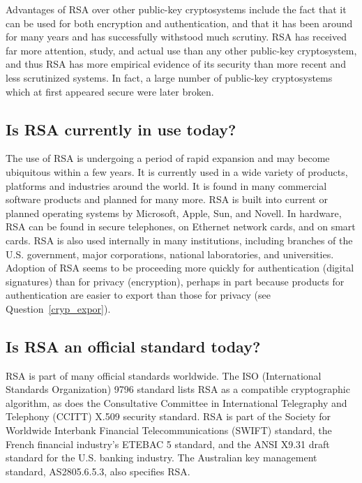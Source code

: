 Advantages of RSA over other public-key cryptosystems include the fact
that it can be used for both encryption and authentication, and that it
has been around for many years and has successfully withstood much
scrutiny. RSA has received far more attention, study, and actual use
than any other public-key cryptosystem, and thus RSA has more empirical
evidence of its security than more recent and less scrutinized systems.
In fact, a large number of public-key cryptosystems which at first
appeared secure were later broken.

\subsection{Is RSA currently in use today?}

The use of RSA is undergoing a period of rapid expansion and may become
ubiquitous within a few years. It is currently used in a wide variety
of products, platforms and industries around the world. It is found in
many commercial software products and planned for many more. RSA is
built into current or planned operating systems by Microsoft, Apple,
Sun, and Novell. In hardware, RSA can be found in secure telephones, on
Ethernet network cards, and on smart cards. RSA is also used internally
in many institutions, including branches of the U.S. government, major
corporations, national laboratories, and universities.\\

Adoption of RSA seems to be proceeding more quickly for authentication
(digital signatures) than for privacy (encryption), perhaps in part
because products for authentication are easier to export than those for
privacy (see Question~\ref{cryp_expor}).

\subsection{Is RSA an official standard today?}

RSA is part of many official standards worldwide. The ISO
(International Standards Organization) 9796 standard lists RSA as a
compatible cryptographic algorithm, as does the Consultative Committee
in International Telegraphy and Telephony (CCITT) X.509 security
standard. RSA is part of the Society for Worldwide Interbank Financial
Telecommunications (SWIFT) standard, the French financial industry's
ETEBAC 5 standard, and the ANSI X9.31 draft standard for the U.S.
banking industry. The Australian key management standard, AS2805.6.5.3,
also specifies RSA.\\

